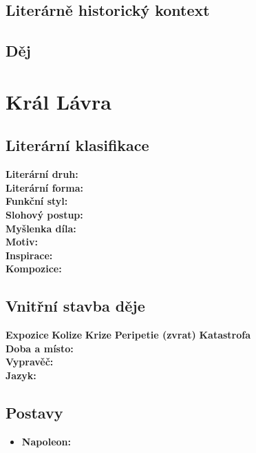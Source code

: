 \documentclass[12pt, a4paper]{article}
\newcommand{\mybf}[1]{\textcolor[RGB]{0, 179, 219}{\textbf{#1}}}
\begin{document}
\subsection*{Literárně historický kontext}

{\color{subsectioncolor}\hrulefill}
\subsection*{\color{subsectioncolor}Děj}

\newpage


\section{Král Lávra}

\subsection*{Literární klasifikace}
\mybf{Literární druh:} \\[3pt]
\mybf{Literární forma:} \\[3pt]
\mybf{Funkční styl:} \\[3pt]
\mybf{Slohový postup:} \\[10pt]
\mybf{Myšlenka díla:} \\[10pt]
\mybf{Motiv:} \\[10pt]
\mybf{Inspirace:} \\[10pt]
\mybf{Kompozice:} 

\subsection*{Vnitřní stavba děje}
\noindent\textbf{Expozice} 
\noindent\textbf{Kolize} 
\noindent\textbf{Krize} 
\noindent\textbf{Peripetie (zvrat)} 
\noindent\textbf{Katastrofa} \\[10pt]
\mybf{Doba a místo:} \\[10pt]
\mybf{Vypravěč:} \\[10pt]
\mybf{Jazyk:} 

\subsection*{Postavy}
\begin{itemize}[itemsep=0.3em]
	\item \textbf{Napoleon:}
\end{itemize}
\end{document}
